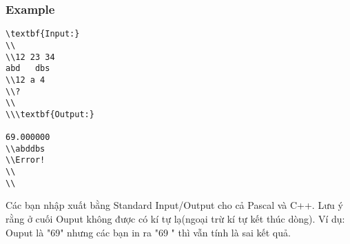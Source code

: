 \subsubsection{   Example  }
\begin{verbatim}
\textbf{Input:}
\\
\\12 23 34
abd   dbs
\\12 a 4 
\\?
\\
\\\textbf{Output:}

69.000000
\\abddbs
\\Error! 
\\
\\\end{verbatim}

Các bạn nhập xuất bằng Standard Input/Output cho cả Pascal và C++. Lưu ý rằng ở cuối Ouput không được có kí tự lạ(ngoại trừ kí tự kết thúc dòng). Ví dụ: Ouput là "69" nhưng các bạn in ra "69 " thì vẫn tính là sai kết quả.

